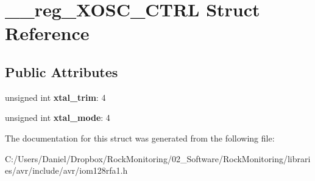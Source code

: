 \hypertarget{struct____reg___x_o_s_c___c_t_r_l}{}\section{\+\_\+\+\_\+reg\+\_\+\+X\+O\+S\+C\+\_\+\+C\+T\+RL Struct Reference}
\label{struct____reg___x_o_s_c___c_t_r_l}
\subsection*{Public Attributes}
\begin{DoxyCompactItemize}
\item 
unsigned int {\bfseries xtal\+\_\+trim}\+: 4\hypertarget{struct____reg___x_o_s_c___c_t_r_l_a8d97905da55ca1f3713e4a2ca9fa1c34}{}\label{struct____reg___x_o_s_c___c_t_r_l_a8d97905da55ca1f3713e4a2ca9fa1c34}

\item 
unsigned int {\bfseries xtal\+\_\+mode}\+: 4\hypertarget{struct____reg___x_o_s_c___c_t_r_l_a5600ecd856bf9f83ab158d5dbac83d42}{}\label{struct____reg___x_o_s_c___c_t_r_l_a5600ecd856bf9f83ab158d5dbac83d42}

\end{DoxyCompactItemize}


The documentation for this struct was generated from the following file\+:\begin{DoxyCompactItemize}
\item 
C\+:/\+Users/\+Daniel/\+Dropbox/\+Rock\+Monitoring/02\+\_\+\+Software/\+Rock\+Monitoring/libraries/avr/include/avr/iom128rfa1.\+h\end{DoxyCompactItemize}
